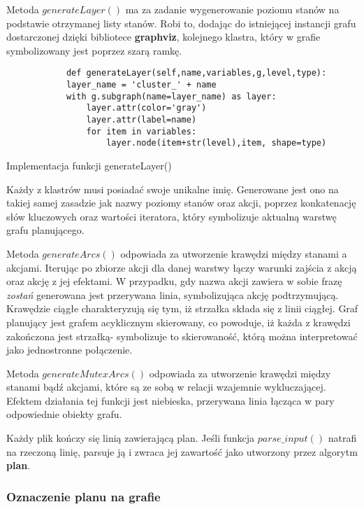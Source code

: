     Metoda $generateLayer()$ ma za zadanie wygenerowanie poziomu stanów na podstawie otrzymanej listy stanów. Robi to, dodając do istniejącej instancji 
    grafu dostarczonej dzięki bibliotece \textbf{graphviz}, kolejnego klastra, który w grafie symbolizowany jest poprzez szarą ramkę.
    \begin{listing}[H]
        \begin{verbatim}
            def generateLayer(self,name,variables,g,level,type):
            layer_name = 'cluster_' + name
            with g.subgraph(name=layer_name) as layer:
                layer.attr(color='gray')
                layer.attr(label=name)
                for item in variables:
                    layer.node(item+str(level),item, shape=type)
        \end{verbatim}
    \caption{Implementacja funkcji generateLayer()}
    \end{listing}
    Każdy z klastrów musi posiadać swoje unikalne imię. Generowane jest ono na takiej samej zasadzie jak nazwy poziomy stanów oraz akcji, poprzez 
    konkatenację słów kluczowych oraz wartości iteratora, który symbolizuje aktualną warstwę grafu planującego. 

    Metoda $generateArcs()$ odpowiada za utworzenie krawędzi między stanami a akcjami. Iterując po zbiorze akcji dla danej warstwy łączy warunki 
    zajścia z akcją oraz akcję z jej efektami. W przypadku, gdy nazwa akcji zawiera w sobie frazę \textit{zostań} generowana jest przerywana linia, 
    symbolizująca akcję podtrzymującą. Krawędzie ciągłe charakteryzują się tym, iż strzałka składa się z linii ciągłej. Graf planujący jest 
    grafem acyklicznym skierowany, co powoduje, iż każda z krawędzi zakończona jest strzałką- symbolizuje to skierowaność, którą można
    interpretować jako jednostronne połączenie.

    Metoda $generateMutexArcs()$ odpowiada za utworzenie krawędzi między stanami bądź akcjami, które są ze sobą w relacji wzajemnie wykluczającej. 
    Efektem działania tej funkcji jest niebieska, przerywana linia łącząca w pary odpowiednie obiekty grafu.

    Każdy plik kończy się linią zawierającą plan. Jeśli funkcja $parse\_input()$ natrafi na rzeczoną linię, parsuje ją i zwraca jej zawartość 
    jako utworzony przez algorytm \textbf{plan}.

    \subsubsection{Oznaczenie planu na grafie}


